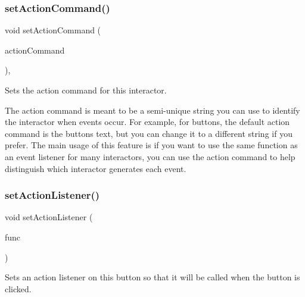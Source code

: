 \mbox{\label{classGInteractor_a4b5843fe3030e038a1ba54cc03389bcf}} 
\subsubsection{\texorpdfstring{set\+Action\+Command()}{setActionCommand()}}
{\footnotesize\ttfamily void set\+Action\+Command (\begin{DoxyParamCaption}\item[{const std\+::string \&}]{action\+Command }\end{DoxyParamCaption})\hspace{0.3cm}{\ttfamily [virtual]}, {\ttfamily [inherited]}}



Sets the action command for this interactor. 

The action command is meant to be a semi-\/unique string you can use to identify the interactor when events occur. For example, for buttons, the default action command is the button\textquotesingle{}s text, but you can change it to a different string if you prefer. The main usage of this feature is if you want to use the same function as an event listener for many interactors, you can use the action command to help distinguish which interactor generates each event. \mbox{\label{classGButton_adcfb4742430c88714fcf57e57ab8ea9c}} 
\subsubsection{\texorpdfstring{set\+Action\+Listener()}{setActionListener()}\hspace{0.1cm}{\footnotesize\ttfamily [1/2]}}
{\footnotesize\ttfamily void set\+Action\+Listener (\begin{DoxyParamCaption}\item[{G\+Event\+Listener}]{func }\end{DoxyParamCaption})\hspace{0.3cm}{\ttfamily [virtual]}}



Sets an action listener on this button so that it will be called when the button is clicked. 

